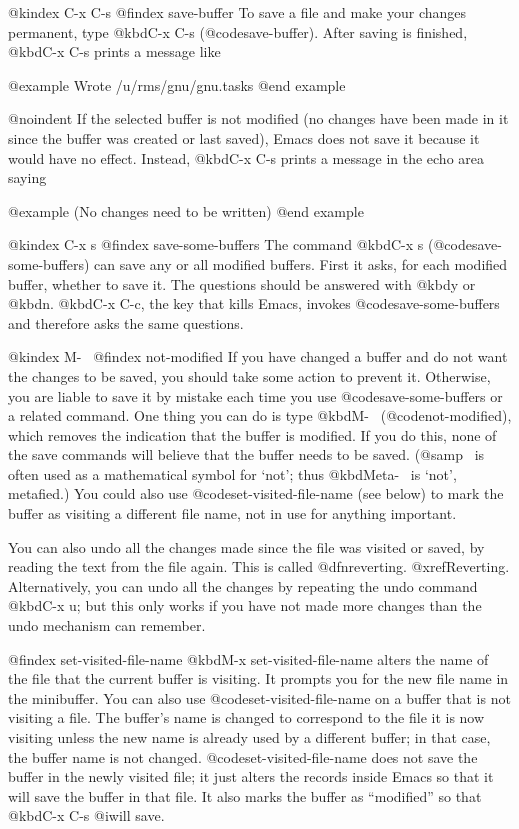 {{{{{{{{{{{{{{{{@kindex C-x C-s
@findex save-buffer
  To save a file and make your changes permanent, type
@kbd{C-x C-s} (@code{save-buffer}).  After saving is finished, @kbd{C-x C-s}
prints a message like

@example
Wrote /u/rms/gnu/gnu.tasks
@end example

@noindent
If the selected buffer is not modified (no changes have been made in it
since the buffer was created or last saved), Emacs does not save it
because it would have no effect.  Instead, @kbd{C-x C-s} prints a message
in the echo area saying

@example
(No changes need to be written)
@end example

@kindex C-x s
@findex save-some-buffers
  The command @kbd{C-x s} (@code{save-some-buffers}) can save any or all
modified buffers.  First it asks, for each modified buffer, whether to
save it.  The questions should be answered with @kbd{y} or @kbd{n}.
@kbd{C-x C-c}, the key that kills Emacs, invokes
@code{save-some-buffers} and therefore asks the same questions.

@kindex M-~
@findex not-modified
  If you have changed a buffer and do not want the changes to be saved,
you should take some action to prevent it.  Otherwise, you are liable to
save it by mistake each time you use @code{save-some-buffers} or a
related command.  One thing you can do is type @kbd{M-~}
(@code{not-modified}), which removes the indication that the buffer
is modified.  If you do this, none of the save commands will believe
that the buffer needs to be saved.  (@samp{~} is often used as a
mathematical symbol for `not'; thus @kbd{Meta-~} is `not', metafied.)
You could also use @code{set-visited-file-name} (see below) to mark the
buffer as visiting a different file name, not in use for
anything important. 

You can also undo all the changes made since the file was visited or
saved, by reading the text from the file again.  This is called
@dfn{reverting}.  @xref{Reverting}.  Alternatively, you can undo all the
changes by repeating the undo command @kbd{C-x u}; but this only works
if you have not made more changes than the undo mechanism can remember.

@findex set-visited-file-name
  @kbd{M-x set-visited-file-name} alters the name of the file that the
current buffer is visiting.  It prompts you for the new file name in the
minibuffer.  You can also use @code{set-visited-file-name} on a buffer
that is not visiting a file.  The buffer's name is changed to correspond
to the file it is now visiting unless the new name is already used by a
different buffer; in that case, the buffer name is not changed.
@code{set-visited-file-name} does not save the buffer in the newly
visited file; it just alters the records inside Emacs so that it will
save the buffer in that file.  It also marks the buffer as ``modified''
so that @kbd{C-x C-s} @i{will} save.

}}}}}}}}}}}}}}}}
